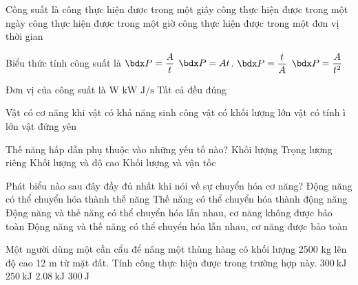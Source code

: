 \begin{ex}
	Công suất là
	\choice
	{công thực hiện được trong một giây}
	{công thực hiện được trong một ngày}
	{công thực hiện được trong một giờ}
	{\True công thực hiện được trong một đơn vị thời gian}
	\loigiai{}
\end{ex}
\begin{ex}
	Biểu thức tính công suất là	
	\choice
	{\True $\calP = \dfrac{A}{t}$}
	{$\calP = At$.}
	{$\calP= \dfrac{t}{A}$}
	{$\calP = \dfrac{A}{t^2}$}
	\loigiai{}
\end{ex}
\begin{ex}
	Đơn vị của công suất là
	\choice
	{$\si{\watt}$}
	{$\si{\kilo\watt}$}
	{$\si{\joule/\second}$}
	{\True Tất cả đều đúng}
	\loigiai{}
\end{ex}
\begin{ex}
	Vật có cơ năng khi
	\choice
	{\True vật có khả năng sinh công}
	{vật có khối lượng lớn}
	{vật có tính ì lớn}
	{vật đứng yên}
\end{ex}
\begin{ex}
	Thế năng hấp dẫn phụ thuộc vào những yếu tố nào?	
	\choice
	{Khối lượng}
	{Trọng lượng riêng}
	{\True Khối lượng và độ cao}
	{Khối lượng và vận tốc}
	\loigiai{}
\end{ex}
\begin{ex}
	Phát biểu nào sau đây đầy đủ nhất khi nói về sự chuyển hóa cơ năng?	
	\choice
	{Động năng có thể chuyển hóa thành thế năng}
	{Thế năng có thể chuyển hóa thành động năng}
	{Động năng và thế năng có thể chuyển hóa lẫn nhau, cơ năng không được bảo toàn}
	{\True Động năng và thế năng có thể chuyển hóa lẫn nhau, cơ năng được bảo toàn}
	\loigiai{}
\end{ex}
\begin{ex}
	Một người dùng một cần cẩu để nâng một thùng hàng có khối lượng 2500 kg lên độ cao 12 m từ mặt đất. Tính công thực hiện được trong trường hợp này.	
	\choice
	{\True $\SI{300}{\kilo\joule}$}
	{$\SI{250}{\kilo\joule}$}
	{$\SI{2.08}{\kilo\joule}$}
	{$\SI{300}{\joule}$}
\end{ex}

